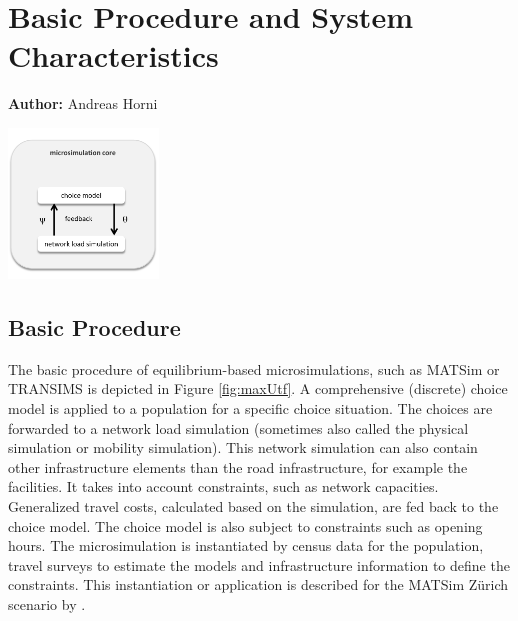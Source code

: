 \chapter{Basic Procedure and System Characteristics}
\label{ch:basicprocedure}
\hfill \textbf{Author:} Andreas Horni 

\begin{center} \includegraphics[width=0.3\textwidth, angle=0]{understanding/figures/fixedpoint.pdf} \end{center}

\section{Basic Procedure}
The basic procedure of equilibrium-based microsimulations, such as MATSim or TRANSIMS is depicted in Figure \ref{fig:maxUtf}. A comprehensive (discrete) choice model is applied to a population for a specific choice situation. The choices are forwarded to a network load simulation (sometimes also called the physical simulation or mobility simulation). This network simulation can also contain other infrastructure elements than the road infrastructure, for example the facilities. It takes into account constraints, such as network capacities. Generalized travel costs, calculated based on the simulation, are fed back to the choice model. The choice model is also subject to constraints such as opening hours. The microsimulation is instantiated by census data for the population, travel surveys to estimate the models and infrastructure information to define the constraints. This instantiation or application is described for the MATSim Zürich scenario by  \citet[][]{HorniEtAl_TechRep_IVT_2011_a}. %

